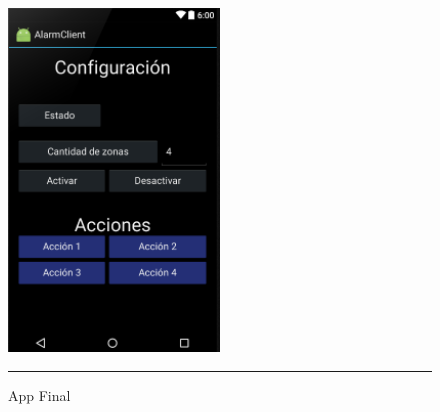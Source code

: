 \begin{figure}[htbp]
	\centering
		\includegraphics[width=0.5\textwidth]{Figures/app_final.png}
		\rule{35em}{1.5pt}
	\caption[Captura de App final]{App Final}
\label{app_final}
\end{figure}
\newpage